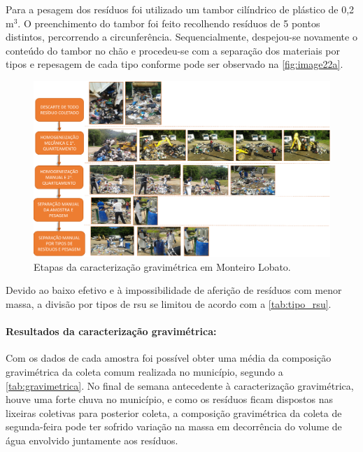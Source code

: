 Para a pesagem dos resíduos foi utilizado um tambor cilíndrico de plástico de 0,2 m$^{3}$. O preenchimento do tambor foi feito recolhendo resíduos de 5 pontos distintos, percorrendo a circunferência. Sequencialmente, despejou-se novamente o conteúdo do tambor no chão e procedeu-se com a separação dos materiais por tipos e repesagem de cada tipo conforme pode ser observado na \autoref{fig:image22a}.

\begin{landscape}

\begin{figure}
	\centering
	\includegraphics[width=1\linewidth]{produtos/prodtres/image22a}
	\caption{Etapas da caracterização gravimétrica em Monteiro Lobato.}
	\label{fig:image22a}
\end{figure}

\end{landscape}

Devido ao baixo efetivo e à impossibilidade de aferição de resíduos com menor massa, a divisão por tipos de \gls{rsu} se limitou de acordo com a \autoref{tab:tipo_rsu}.

	


\paragraph{\textbf{Resultados da caracterização gravimétrica:}}

Com os dados de cada amostra foi possível obter uma média da composição gravimétrica da coleta comum realizada no município, segundo a \autoref{tab:gravimetrica}. No final de semana antecedente à caracterização gravimétrica, houve uma forte chuva no município, e como os resíduos ficam dispostos nas lixeiras coletivas para posterior coleta, a composição gravimétrica da coleta de segunda-feira pode ter sofrido variação na massa em decorrência do volume de água envolvido juntamente aos resíduos.

